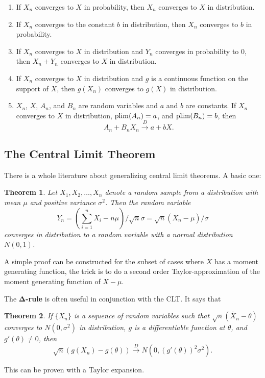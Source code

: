 \documentclass[10pt]{article}
\newtheorem{theorem}{Theorem}%
\begin{document}
\begin{enumerate}
\item If $X_n$ converges to $X$ in probability, then $X_n$ converges to $X$ in distribution.
\item If $X_n$ converges to the constant $b$ in distribution, then $X_n$
converges to $b$ in probability.
\item If $X_n$ converges to $X$ in distribution and $Y_n$ converges in probability to $0$,
then $X_n+Y_n$ converges to $X$ in distribution.
\item If $X_n$ converges to $X$ in distribution and $g$ is a continuous function on the support
of $X$, then $g(X_n)$ converges to $g(X)$ in distribution.
\item $X_n$, $X$, $A_n$, and $B_n$ are random variables and $a$ and $b$ are constants. 
If $X_n$ converges to $X$ in distribution, $\operatorname{plim}(A_n)=a$, and $\operatorname{plim}(B_n)=b$, then
\[ A_n + B_n X_n \xrightarrow{D} a + bX.\]
\end{enumerate}


\subsection{The Central Limit Theorem}
There is a whole literature about generalizing central limit theorems. A basic one:

\begin{theorem}
Let $X_1,X_2,\dots,X_n$ denote a random sample from a distribution with mean
$\mu$ and positive variance $\sigma^2$. Then the random variable \[ Y_n =
\left(\sum_{i=1}^n X_i - n\mu \right)/\sqrt{n}\sigma =
\sqrt{n}(\overline{X}_n-\mu)/\sigma\] converges in distribution to a random
variable with a normal distribution $N(0,1)$. 
\end{theorem}

A simple proof can be constructed for the subset of cases where $X$ has a moment generating
function, the trick is to do a second order Taylor-approximation of the moment generating
function of $X-\mu$. 

The $\mathbf{\Delta}$\textbf{-rule} is often useful in conjunction with the CLT.
It says that 

\begin{theorem}
If $\{X_n\}$ is a sequence of random variables such that $\sqrt{n}(\overline{X}_n-\theta)$
converges to $N(0,\sigma^2)$ in distribution, $g$ is a differentiable function at $\theta$,
and $g'(\theta)\neq 0$, then 
\[ \sqrt{n}\left(g(X_n) - g(\theta)\right) \xrightarrow{D} 
N\left(0, \left(g'(\theta)\right)^2\sigma^2\right).\]
\end{theorem}
This can be proven with a Taylor expansion. 
\end{document}

